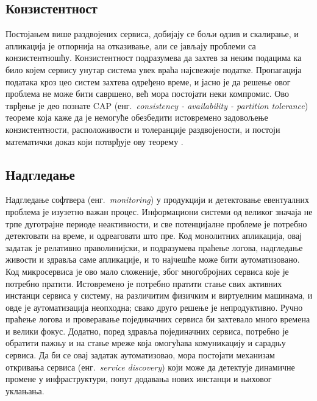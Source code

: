 \documentclass[12pt,oneside]{memoir}
\begin{document}
\subsection{Конзистентност}
Постојањем више раздвојених сервиса, добијају се бољи одзив и скалирање, и апликација је отпорнија на отказивање, али се јављају проблеми са конзистентношћу. Конзистентност подразумева да захтев за неким подацима ка било којем сервису унутар система увек враћа најсвежије податке. Пропагација података кроз цео систем захтева одређено време, и јасно је да решење овог проблема не може бити савршено, већ мора постојати неки компромис. Ово тврђење је део познате CAP (енг.~\textit{consistency - availability - partition tolerance}) теореме која каже да је немогуће обезбедити истовремено задовољење конзистентности, расположивости и толеранције раздвојености, и постоји математички доказ који потврђује ову теорему \cite{10.1145/564585.564601}.

\subsection{Надгледање}
Надгледање софтвера (енг.~\textit{monitoring}) у продукцији и детектовање евентуалних проблема је изузетно важан процес. Информациони системи од великог значаја не трпе дуготрајне периоде неактивности, и све потенцијалне проблеме је потребно детектовати на време, и одреаговати што пре. Код монолитних апликација, овај задатак је релативно праволинијски, и подразумева праћење логова, надгледање живости и здравља саме апликације, и то најчешће може бити аутоматизовано. Код микросервиса је ово мало сложеније, због многобројних сервиса које је потребно пратити. Истовремено је потребно пратити стање свих активних инстанци сервиса у систему, на различитим физичким и виртуелним машинама, и овде је аутоматизација неопходна; свако друго решење је непродуктивно. Ручно праћење логова и проверавање појединачних сервиса би захтевало много времена и велики фокус. Додатно, поред здравља појединачних сервиса, потребно је обратити пажњу и на стање мреже која омогућава комуникацију и сарадњу сервиса. Да би се овај задатак аутоматизовао, мора постојати механизам откривања сервиса (енг.~\textit{service discovery}) који може да детектује динамичне промене у инфраструктури, попут додавања нових инстанци и њиховог уклањања.
\end{document}
